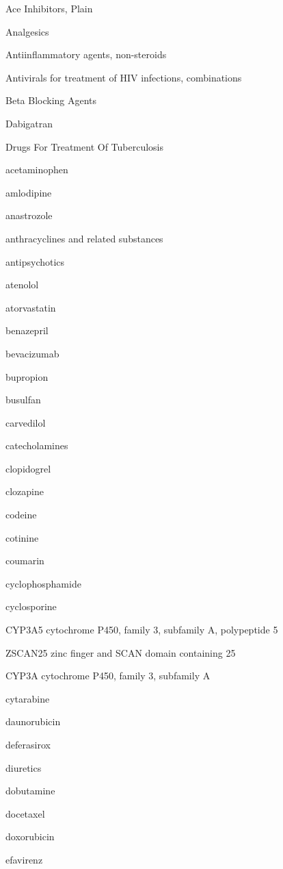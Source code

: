 \documentclass{resume} %
\begin{document}
\begin{rSection}{ Ace Inhibitors, Plain }
\begin{rSection}{ Analgesics }
\begin{rSection}{ Antiinflammatory agents, non-steroids }
\begin{rSection}{ Antivirals for treatment of HIV infections, combinations }
\begin{rSection}{ Beta Blocking Agents }
\begin{rSection}{ Dabigatran }
\begin{rSection}{ Drugs For Treatment Of Tuberculosis }
\begin{rSection}{ acetaminophen }
\begin{rSection}{ amlodipine }
\begin{rSection}{ anastrozole }
\begin{rSection}{ anthracyclines and related substances }
\begin{rSection}{ antipsychotics }
\begin{rSection}{ atenolol }
\begin{rSection}{ atorvastatin }
\begin{rSection}{ benazepril }
\begin{rSection}{ bevacizumab }
\begin{rSection}{ bupropion }
\begin{rSection}{ busulfan }
\begin{rSection}{ carvedilol }
\begin{rSection}{ catecholamines }
\begin{rSection}{ clopidogrel }
\begin{rSection}{ clozapine }
\begin{rSection}{ codeine }
\begin{rSection}{ cotinine }
\begin{rSection}{ coumarin }
\begin{rSection}{ cyclophosphamide }
\begin{rSection}{ cyclosporine }
\begin{rSubsection}{ CYP3A5 }{ cytochrome P450, family 3, subfamily A, polypeptide 5 }{}{}
\end{rSubsection}
\end{rSection}\begin{rSubsection}{ ZSCAN25 }{ zinc finger and SCAN domain containing 25 }{}{}
\item[]

\end{rSubsection}
\end{rSection}\begin{rSubsection}{ CYP3A }{ cytochrome P450, family 3, subfamily A }{}{}
\item[]

\end{rSubsection}
\end{rSection}\begin{rSection}{ cytarabine }
\item[]
\begin{rSection}{ daunorubicin }
\item[]
\begin{rSection}{ deferasirox }
\item[]
\begin{rSection}{ diuretics }
\item[]
\begin{rSection}{ dobutamine }
\item[]
\begin{rSection}{ docetaxel }
\item[]
\begin{rSection}{ doxorubicin }
\item[]
\begin{rSection}{ efavirenz }
\item[]

\end{rSection}
\end{rSection}
\end{rSection}
\end{rSection}
\end{rSection}
\end{rSection}
\end{rSection}
\end{rSection}
\end{rSection}
\end{rSection}
\end{rSection}
\end{rSection}
\end{rSection}
\end{rSection}
\end{rSection}
\end{rSection}
\end{rSection}
\end{rSection}
\end{rSection}
\end{rSection}
\end{rSection}
\end{rSection}
\end{rSection}
\end{rSection}
\end{rSection}
\end{rSection}
\end{rSection}
\end{rSection}
\end{rSection}
\end{rSection}
\end{rSection}
\end{rSection}
\end{document}
